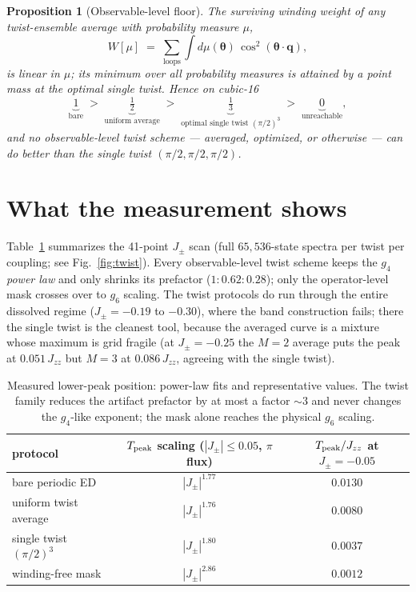 \documentclass[11pt]{article}
\newtheorem{prop}{Proposition}
\newcommand{\Jpm}{J_{\pm}}
\newcommand{\Jzz}{J_{zz}}
\newcommand{\btheta}{\boldsymbol{\theta}}
\newcommand{\bq}{\mathbf{q}}
\begin{document}
\begin{prop}[Observable-level floor]
The surviving winding weight of any twist-ensemble average with probability
measure $\mu$,
\begin{equation}
  W[\mu] \;=\; \sum_{\text{loops}} \int \! d\mu(\btheta)\,
  \cos^2(\btheta\cdot\bq),
\end{equation}
is linear in $\mu$; its minimum over all probability measures is attained by
a point mass at the optimal single twist.  Hence on cubic-16
\begin{equation*}
  \underbrace{1}_{\text{bare}} \;>\;
  \underbrace{\tfrac12}_{\text{uniform average}} \;>\;
  \underbrace{\tfrac13}_{\text{optimal single twist }(\pi/2)^3} \;>\;
  \underbrace{0}_{\text{unreachable}} ,
\end{equation*}
and no observable-level twist scheme --- averaged, optimized, or otherwise ---
can do better than the single twist $(\pi/2,\pi/2,\pi/2)$.
\end{prop}

\section{What the measurement shows}

Table~\ref{tab:powerlaws} summarizes the 41-point $\Jpm$ scan
(full $65{,}536$-state spectra per twist per coupling; see
Fig.~\ref{fig:twist}).  Every observable-level twist scheme keeps the $g_4$
\emph{power law} and only shrinks its prefactor ($1 : 0.62 : 0.28$); only the
operator-level mask crosses over to $g_6$ scaling.  The twist protocols do
run through the entire dissolved regime ($\Jpm = -0.19$ to $-0.30$), where the
band construction fails; there the single twist is the cleanest tool, because
the averaged curve is a mixture whose maximum is grid fragile (at
$\Jpm=-0.25$ the $M{=}2$ average puts the peak at $0.051\,\Jzz$ but $M{=}3$ at
$0.086\,\Jzz$, agreeing with the single twist).

\begin{table}[h]
\centering
\begin{tabular}{lcc}
\toprule
protocol & $T_{\rm peak}$ scaling ($|\Jpm|\le 0.05$, $\pi$ flux) &
$T_{\rm peak}/\Jzz$ at $\Jpm=-0.05$\\
\midrule
bare periodic ED           & $|\Jpm|^{1.77}$ & $0.0130$\\
uniform twist average      & $|\Jpm|^{1.76}$ & $0.0080$\\
single twist $(\pi/2)^3$   & $|\Jpm|^{1.80}$ & $0.0037$\\
winding-free mask          & $|\Jpm|^{2.86}$ & $0.0012$\\
\bottomrule
\end{tabular}
\caption{Measured lower-peak position: power-law fits and representative
values.  The twist family reduces the artifact prefactor by at most a factor
$\sim3$ and never changes the $g_4$-like exponent; the mask alone reaches the
physical $g_6$ scaling.}
\label{tab:powerlaws}
\end{table}
\end{document}
